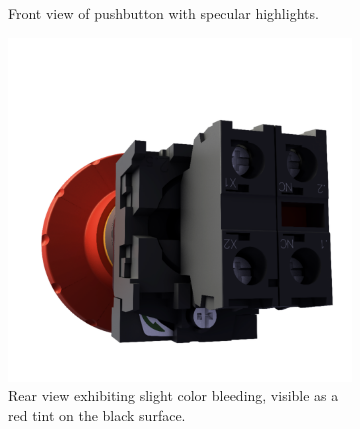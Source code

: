 \begin{figure}[H]
\begin{subfigure}[t]{0.4\textwidth}
        \caption{Front view of pushbutton with specular highlights.}
        \label{fig:demo-specular}
    \end{subfigure}
    \hspace*{1cm}
    \vfill
    \vspace*{0.5cm}
    \hspace*{1cm}
    \begin{subfigure}[t]{0.4\textwidth}
        \includegraphics[width=\textwidth]{resources/demo-color-bleeding.png}
        \caption{Rear view exhibiting slight color bleeding, visible as a red tint on the black surface.}
        \label{fig:demo-color-bleeding}
    \end{subfigure}
    \hfill
    \begin{subfigure}[t]{0.4\textwidth}

\end{subfigure}
\end{figure}
